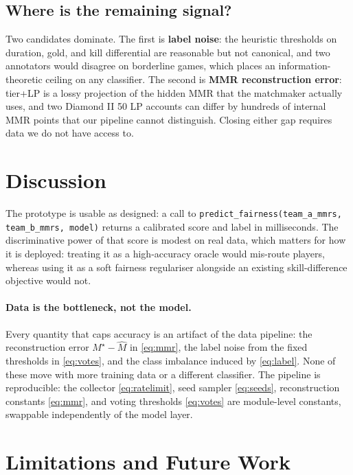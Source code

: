 \documentclass{article}
\begin{document}
\subsection{Where is the remaining signal?}
Two candidates dominate. The first is \textbf{label noise}: the heuristic
thresholds on duration, gold, and kill differential are reasonable but not
canonical, and two annotators would disagree on borderline games, which
places an information-theoretic ceiling on any classifier. The second is
\textbf{MMR reconstruction error}: tier+LP is a lossy projection of the
hidden MMR that the matchmaker actually uses, and two Diamond II 50 LP
accounts can differ by hundreds of internal MMR points that our pipeline
cannot distinguish. Closing either gap requires data we do not have
access to.

\section{Discussion}
\label{sec:discussion}

The prototype is usable as designed: a call to
\texttt{predict\_fairness(team\_a\_mmrs, team\_b\_mmrs, model)} returns a
calibrated score and label in milliseconds. The discriminative power of
that score is modest on real data, which matters for how it is deployed:
treating it as a high-accuracy oracle would mis-route players, whereas
using it as a soft fairness regulariser alongside an existing
skill-difference objective would not.

\paragraph{Data is the bottleneck, not the model.}
Every quantity that caps accuracy is an artifact of the data pipeline:
the reconstruction error $M^\star - \widehat{M}$ in \eqref{eq:mmr}, the
label noise from the fixed thresholds in \eqref{eq:votes}, and the class
imbalance induced by \eqref{eq:label}. None of these move with more
training data or a different classifier. The pipeline is reproducible:
the collector \eqref{eq:ratelimit}, seed sampler \eqref{eq:seeds},
reconstruction constants \eqref{eq:mmr}, and voting thresholds
\eqref{eq:votes} are module-level constants, swappable independently of
the model layer.

\section{Limitations and Future Work}
\label{sec:limitations}
\end{document}
